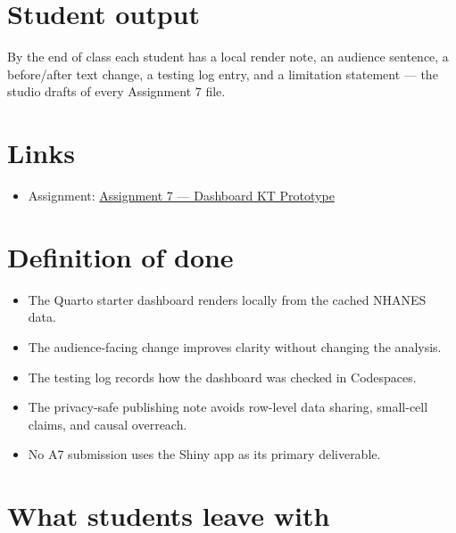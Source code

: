\documentclass[
  letterpaper,
  DIV=11,
  numbers=noendperiod,
  oneside]{scrreprt}
\providecommand{\tightlist}{%
  \setlength{\itemsep}{0pt}\setlength{\parskip}{0pt}}
\begin{document}
\section*{Student output}\label{student-output-5}


By the end of class each student has a local render note, an audience
sentence, a before/after text change, a testing log entry, and a
limitation statement --- the studio drafts of every Assignment 7 file.

\section*{Links}\label{links-2}


\begin{itemize}
\tightlist
\item
  Assignment:
  \href{../../assignments/assignment07-dashboard/README.md}{Assignment 7
  --- Dashboard KT Prototype}
\end{itemize}

\section*{Definition of done}\label{definition-of-done-4}


\begin{itemize}
\tightlist
\item
  The Quarto starter dashboard renders locally from the cached NHANES
  data.
\item
  The audience-facing change improves clarity without changing the
  analysis.
\item
  The testing log records how the dashboard was checked in Codespaces.
\item
  The privacy-safe publishing note avoids row-level data sharing,
  small-cell claims, and causal overreach.
\item
  No A7 submission uses the Shiny app as its primary deliverable.
\end{itemize}

\section*{What students leave with}\label{what-students-leave-with-3}
\end{document}
